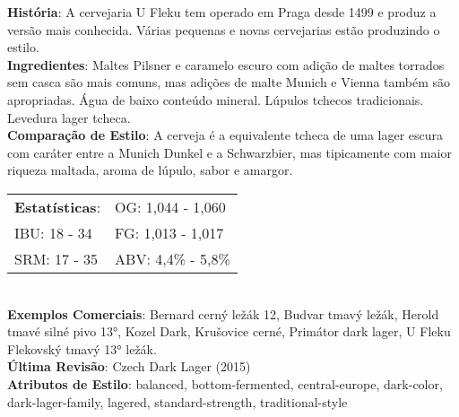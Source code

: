 \textbf{História}: A cervejaria U Fleku tem operado em Praga desde 1499 e produz a versão mais conhecida. Várias pequenas e novas cervejarias estão produzindo o estilo. \\
\textbf{Ingredientes}: Maltes Pilsner e caramelo escuro com adição de maltes torrados sem casca são mais comuns, mas adições de malte Munich e Vienna também são apropriadas. Água de baixo conteúdo mineral. Lúpulos tchecos tradicionais. Levedura lager tcheca. \\
\textbf{Comparação de Estilo}: A cerveja é a equivalente tcheca de uma lager escura com caráter entre a Munich Dunkel e a Schwarzbier, mas tipicamente com maior riqueza maltada, aroma de lúpulo, sabor e amargor. \\
\begin{tabular}{@{}p{35mm}p{35mm}@{}}
  \textbf{Estatísticas}: & OG: 1,044 - 1,060 \\
  IBU: 18 - 34  & FG: 1,013 - 1,017  \\
  SRM: 17 - 35   & ABV: 4,4\% - 5,8\%
\end{tabular}\\
\textbf{Exemplos Comerciais}: Bernard cerný ležák 12, Budvar tmavý ležák, Herold tmavé silné pivo 13°, Kozel Dark, Krušovice cerné, Primátor dark lager, U Fleku Flekovský tmavý 13° ležák. \\
\textbf{Última Revisão}: Czech Dark Lager (2015) \\
\textbf{Atributos de Estilo}: balanced, bottom-fermented, central-europe, dark-color, dark-lager-family, lagered, standard-strength, traditional-style
